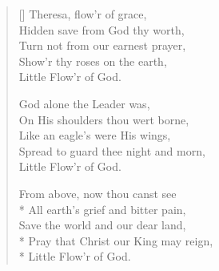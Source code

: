 \newHymn
{}

\begin{verse}[\versewidth]
 Theresa, flow'r of grace,\\
Hidden save from God thy worth,\\
Turn not from our earnest prayer,\\
Show'r thy roses on the earth,\\
\vin Little Flow'r of God.

God alone the Leader was,\\
On His shoulders thou wert borne,\\
Like an eagle's were His wings,\\
Spread to guard thee night and morn,\\
\vin Little Flow'r of God.

From above, now thou canst see\\*
All earth's grief and bitter pain,\\
Save the world and our dear land,\\*
Pray that Christ our King may reign,\\*
\vin Little Flow'r of God.

\end{verse}

